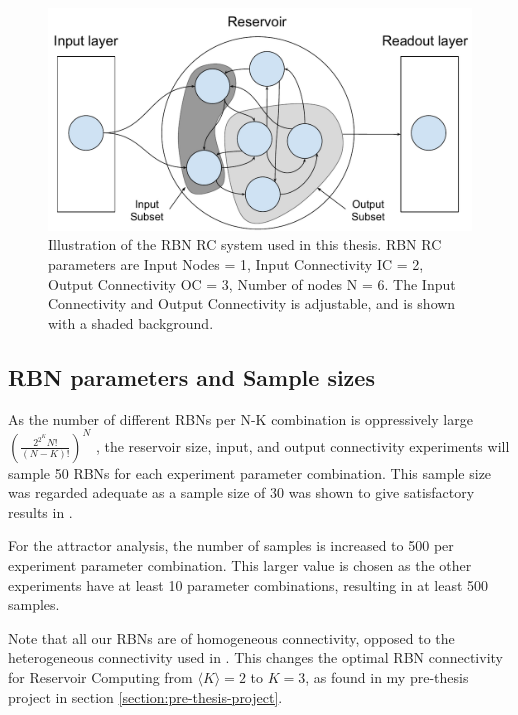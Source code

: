 \begin{figure}
    \centering
    \caption[Illustration of the RBN RC system used in this thesis]{
        Illustration of the RBN RC system used in this thesis.
        RBN RC parameters are Input Nodes = 1, Input Connectivity IC = 2, Output Connectivity OC = 3, Number of nodes N = 6.
        The Input Connectivity and Output Connectivity is adjustable,
        and is shown with a shaded background.
    }
    \label{figure:rbn-reservoir-subsets}
    \includegraphics[width=\columnwidth]{method/rbn_reservoir_subsets.pdf}
\end{figure}

\subsection{RBN parameters and Sample sizes}

As the number of different RBNs per N-K combination is oppressively large
$(\frac{2^{2^{K}}N!}{(N-K)!})^N$ \cite{gershenson2004introduction},
the reservoir size, input, and output connectivity experiments will sample 50 RBNs for each experiment parameter combination.
This sample size was regarded adequate as a sample size of 30 was shown to give satisfactory results in \cite{burkow2015evolving}.

For the attractor analysis, the number of samples is increased to 500 per experiment parameter combination.
This larger value is chosen as the other experiments have at least 10 parameter combinations,
resulting in at least 500 samples.

Note that all our RBNs are of homogeneous connectivity,
opposed to the heterogeneous connectivity used in \cite{rbn-reservoir}.
This changes the optimal RBN connectivity for Reservoir Computing from $ \langle K \rangle = 2 $ to $ K = 3$,
as found in my pre-thesis project in section \ref{section:pre-thesis-project}.

